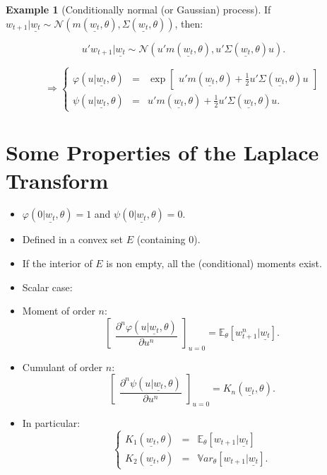 \documentclass[
  12pt,
]{book}
\theoremstyle{definition}
\theoremstyle{definition}
\newtheorem{example}{Example}[chapter]
\theoremstyle{definition}
\theoremstyle{definition}
\theoremstyle{remark}
\begin{document}
\begin{example}[Conditionally normal (or Gaussian) process]
\protect\hypertarget{exm:exGaussian}{}\label{exm:exGaussian}If \(w_{t+1}|\underline{w_t} \sim \mathcal{N}\left(m(\underline{w_t},\theta), \Sigma(\underline{w_t},\theta)\right)\), then:

\[
u'w_{t+1}|\underline{w_t} \sim \mathcal{N}\left(u'm(\underline{w_t},\theta), u'\Sigma(\underline{w_t},\theta)u\right).
\]

\[
\Rightarrow
\left\{
\begin{array}{ccc}
\varphi(u|\underline{w_t},\theta) &=& \exp\left[
\begin{array}{l} u'm(\underline{w_t},\theta)+
\frac{1}{2} u'\Sigma(\underline{w_t},\theta)u\end{array}
\right]\\
\psi(u|\underline{w_t},\theta) &=&
u'm(\underline{w_t},\theta) +  \frac{1}{2}
u'\Sigma(\underline{w_t},\theta)u.
\end{array}
\right.
\]
\end{example}

\hypertarget{AffineLaplace}{%
\section{Some Properties of the Laplace Transform}\label{AffineLaplace}}

\begin{itemize}
\item
  \(\varphi(0|\underline{w_t},\theta) = 1\) and \(\psi(0|\underline{w_t},\theta)=0\).
\item
  Defined in a convex set \(E\) (containing \(0\)).
\item
  If the interior of \(E\) is non empty, all the (conditional) moments exist.
\item
  Scalar case:
\item
  Moment of order \(n\):
  \[
  \left[ \begin{array}{l}  \dfrac{\partial^n
  \varphi(u|\underline{w_t},\theta)}{\partial u^n}
  \end{array} \right]_{u=0} = \mathbb{E}_{\theta}[w^n_{t+1}|\underline{w_t}].
  \]
\item
  Cumulant of order \(n\):
  \[
  \left[ \begin{array}{l}  \dfrac{\partial^n
  \psi(u|\underline{w_t},\theta)}{\partial u^n}
  \end{array} \right]_{u=0} = K_n(\underline{w_t},\theta).
  \]
\item
  In particular:
  \[
  \left\{
  \begin{array}{ccc}
  K_1(\underline{w_t},\theta) &=& \mathbb{E}_{\theta}[w_{t+1}|\underline{w_t}]\\
  K_2(\underline{w_t}, \theta) &=& \mathbb{V}ar_{\theta}[w_{t+1}|\underline{w_t}].
  \end{array}
  \right.
  \]
\end{itemize}
\end{document}
